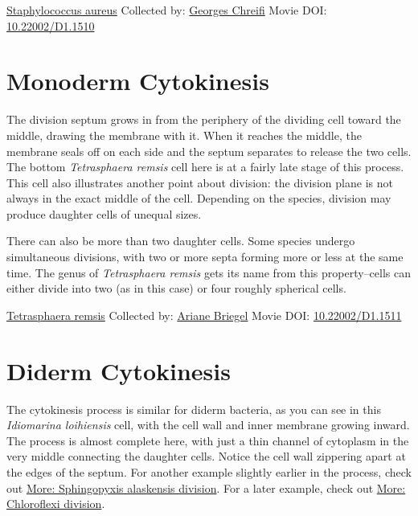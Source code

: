 \documentclass[]{tufte-book}
\begin{document}
\label{fig:5-4}\protect\hyperlink{tree}{Staphylococcus aureus} Collected by: \protect\hyperlink{georges_chreifi}{Georges Chreifi} Movie DOI: \href{https://doi.org/10.22002/D1.1510}{10.22002/D1.1510}

\hypertarget{monoderm-cytokinesis}{%
\section{Monoderm Cytokinesis}\label{monoderm-cytokinesis}}

The division septum grows in from the periphery of the dividing cell toward the middle, drawing the membrane with it. When it reaches the middle, the membrane seals off on each side and the septum separates to release the two cells. The bottom \emph{Tetrasphaera remsis} cell here is at a fairly late stage of this process. This cell also illustrates another point about division: the division plane is not always in the exact middle of the cell. Depending on the species, division may produce daughter cells of unequal sizes.

There can also be more than two daughter cells. Some species undergo simultaneous divisions, with two or more septa forming more or less at the same time. The genus of \emph{Tetrasphaera remsis} gets its name from this property--cells can either divide into two (as in this case) or four roughly spherical cells.



\hypertarget{htmlwidget-d7e26dfe66fa0353a583}{}

\label{fig:5-5}\protect\hyperlink{tree}{Tetrasphaera remsis} Collected by: \protect\hyperlink{ariane_briegel}{Ariane Briegel} Movie DOI: \href{https://doi.org/10.22002/D1.1511}{10.22002/D1.1511}

\hypertarget{diderm-cytokinesis}{%
\section{Diderm Cytokinesis}\label{diderm-cytokinesis}}

The cytokinesis process is similar for diderm bacteria, as you can see in this \emph{Idiomarina loihiensis} cell, with the cell wall and inner membrane growing inward. The process is almost complete here, with just a thin channel of cytoplasm in the very middle connecting the daughter cells. Notice the cell wall zippering apart at the edges of the septum. For another example slightly earlier in the process, check out \protect\hyperlink{Sphingopyxis_alaskensis_division}{More: Sphingopyxis alaskensis division}. For a later example, check out \protect\hyperlink{Chloroflexi_division}{More: Chloroflexi division}.
\end{document}
